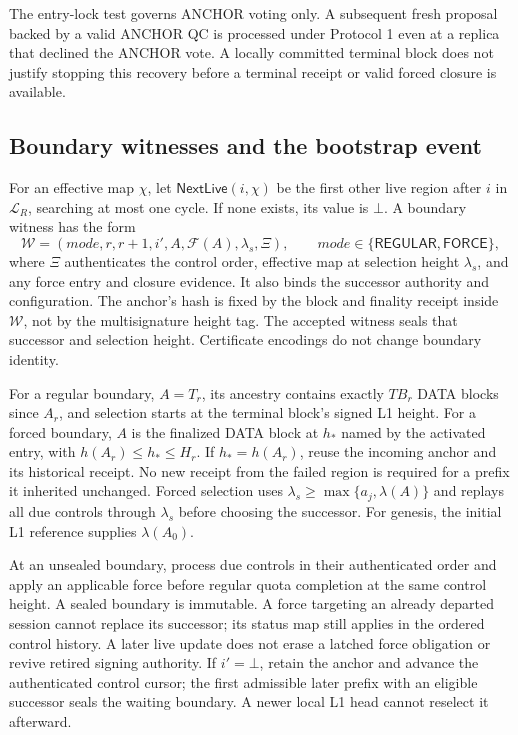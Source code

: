 \documentclass[11pt,a4paper]{article}
\newcommand{\FC}{\mathcal F}
\newcommand{\tagg}[1]{\ensuremath{\mathsf{#1}}}
\begin{document}
The entry-lock test governs ANCHOR voting only. A subsequent fresh
proposal backed by a valid ANCHOR QC is processed under Protocol 1 even
at a replica that declined the ANCHOR vote. A locally committed terminal
block does not justify stopping this recovery before a terminal receipt
or valid forced closure is available.

\subsection{Boundary witnesses and the bootstrap event}
\label{sec:boundary}
For an effective map $\chi$, let $\tagg{NextLive}(i,\chi)$ be the first
other live region after $i$ in $\mathcal L_R$, searching at most one cycle.
If none exists, its value is $\bot$. A boundary witness has the form
\[
 \mathcal W=(\mathit{mode},r,r+1,i',A,\FC(A),\lambda_s,\Xi),
 \qquad \mathit{mode}\in\{\tagg{REGULAR},\tagg{FORCE}\},
\]
where $\Xi$ authenticates the control order, effective map at selection
height $\lambda_s$, and any force entry and closure evidence. It also
binds the successor authority and configuration. The anchor's hash is
fixed by the block and finality receipt inside $\mathcal W$, not by the
multisignature height tag. The accepted witness seals that successor and
selection height. Certificate encodings do not change boundary identity.

For a regular boundary, $A=T_r$, its ancestry contains exactly $TB_r$
DATA blocks since $A_r$, and selection starts at the terminal block's
signed L1 height. For a forced boundary, $A$ is the finalized DATA block
at $h_*$ named by the activated entry, with
$h(A_r)\le h_*\le H_r$. If $h_*=h(A_r)$, reuse the incoming anchor and
its historical receipt. No new receipt from the failed region is required
for a prefix it inherited unchanged.
Forced selection uses $\lambda_s\ge\max\{a_j,\lambda(A)\}$ and replays
all due controls through $\lambda_s$ before choosing the successor.
For genesis, the initial L1 reference supplies $\lambda(A_0)$.

At an unsealed boundary, process due controls in their authenticated
order and apply an applicable force before regular quota completion at
the same control height. A sealed boundary is immutable. A force targeting
an already departed session cannot replace its successor; its status map
still applies in the ordered control history. A later live update does
not erase a latched force obligation or revive retired signing authority.
If $i'=\bot$, retain the anchor and advance the authenticated control
cursor; the first admissible later prefix with an eligible successor seals
the waiting boundary. A newer local L1 head cannot reselect it afterward.
\end{document}

